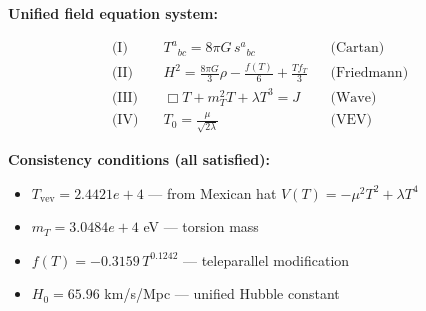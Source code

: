 
\textbf{Unified field equation system:}

\begin{align}
  \text{(I)} \quad & T^a{}_{bc} = 8\pi G \, s^a{}_{bc} && \text{(Cartan)} \\
  \text{(II)} \quad & H^2 = \frac{8\pi G}{3}\rho - \frac{f(T)}{6} + \frac{Tf_T}{3} && \text{(Friedmann)} \\
  \text{(III)} \quad & \Box T + m_T^2 T + \lambda T^3 = J && \text{(Wave)} \\
  \text{(IV)} \quad & T_0 = \frac{\mu}{\sqrt{2\lambda}} && \text{(VEV)}
\end{align}

\textbf{Consistency conditions (all satisfied):}
\begin{itemize}
  \item $T_{\text{vev}} = 2.4421e+4$ — from Mexican hat $V(T) = -\mu^2 T^2 + \lambda T^4$
  \item $m_T = 3.0484e+4$ eV — torsion mass
  \item $f(T) = -0.3159 \, T^{0.1242}$ — teleparallel modification
  \item $H_0 = 65.96$ km/s/Mpc — unified Hubble constant
\end{itemize}